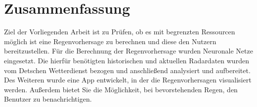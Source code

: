 \section*{Zusammenfassung}
Ziel der Vorliegenden Arbeit ist zu Prüfen, ob es mit begrenzten Ressourcen möglich ist eine Regenvorhersage zu berechnen und diese den Nutzern bereitzustellen.
Für die Berechnung der Regenvorhersage wurden Neuronale Netze eingesetzt.
Die hierfür benötigten historischen und aktuellen Radardaten wurden vom Detschen Wetterdienst bezogen und anschließend analysiert und aufbereitet. 
Des Weiteren wurde eine App entwickelt, in der die Regenvorhersagen visualisiert werden. 
Außerdem bietet Sie die Möglichkeit, bei bevorstehenden Regen, den Benutzer zu benachrichtigen. 